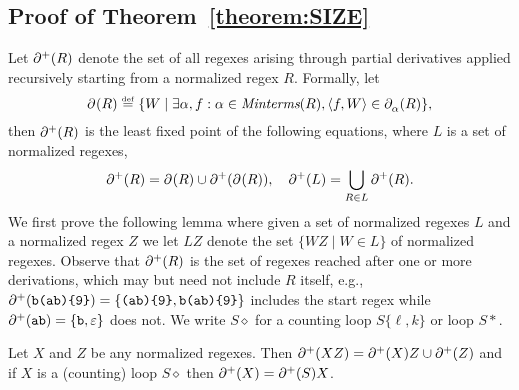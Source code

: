 \subsection{Proof of Theorem~\ref{theorem:SIZE}\label{app:theorem:SIZE}}

Let $\partial^{+}(R)$ denote the set of all regexes arising through partial
  derivatives applied recursively starting from a normalized regex $R$.
  Formally, let
  \[
  \CD{}{R}\eqdef \{W\mid \exists\alpha,f:\alpha\in\Minterms{R},\pair{f}{W}\in\CD{\alpha}{R}\},
  \]
  then
  $\partial^{+}(R)$ is the least fixed point of the following equations,
  where $L$ is a set of normalized regexes,
  \[
\partial^{+}(R) = \partial_{}^{{}}(R) \cup \partial^{+}(\partial_{}^{{}}(R)), \quad \partial^{+}(L) = \bigcup_{R\in L}\partial^{+}(R).
\]
We first prove the following lemma where given a set of normalized regexes $L$ and
a normalized regex $Z$ we let $LZ$ denote the set $\{WZ\mid W\in L\}$ of normalized regexes.
Observe that $\partial^{+}(R)$ is the set of regexes reached after one or more derivations, 
which may but need not
include $R$ itself, e.g., $\partial^{+}(\texttt{b(ab)\{9\}}) = \{\texttt{(ab)\{9\}}, \texttt{b(ab)\{9\}}\}$ includes the start regex while
$\partial^{+}(\texttt{ab}) = \{\texttt{b},\varepsilon\}$ does not.
We write $S{\diamond}$ for a counting loop $S\{\ell,k\}$ or loop $S{*}$.
\begin{lemma}
  \label{lemma:CDp}
  Let $X$ and $Z$ be any normalized regexes.
  Then $\partial^{+}(XZ)=\partial^{+}(X)Z\cup\partial^{+}(Z)$ and if $X$ is a (counting) loop
  $S{\diamond}$ then $\partial^{+}(X)=\partial^{+}(S)X$.
\end{lemma}
